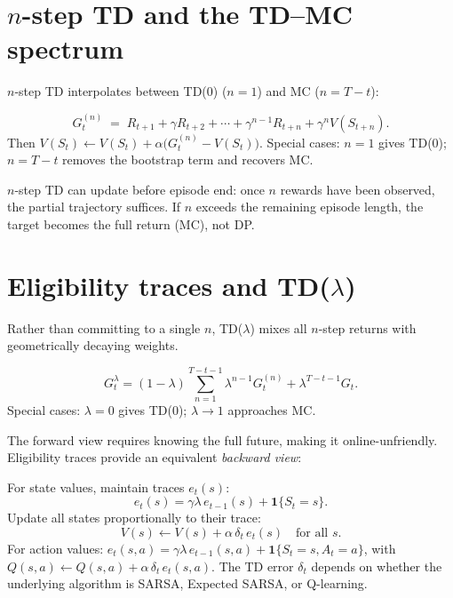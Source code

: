 \documentclass[11pt, oneside]{book}
\begin{document}
\section{$n$-step TD and the TD--MC spectrum}

$n$-step TD interpolates between TD(0) ($n=1$) and MC ($n=T-t$):

\begin{thmbox}[title={$n$-Step Return}]
\[
  G_t^{(n)} \;=\; R_{t+1} + \gamma R_{t+2} + \cdots
    + \gamma^{n-1}R_{t+n} + \gamma^n V(S_{t+n}).
\]
Then $V(S_t) \leftarrow V(S_t) + \alpha\bigl(G_t^{(n)} - V(S_t)\bigr)$.
Special cases: $n=1$ gives TD(0); $n = T-t$ removes the bootstrap term and
recovers MC.
\end{thmbox}

$n$-step TD can update before episode end: once $n$ rewards have been
observed, the partial trajectory suffices.
If $n$ exceeds the remaining episode length, the target becomes the full
return (MC), not DP.

\section{Eligibility traces and TD($\lambda$)}

Rather than committing to a single $n$, TD($\lambda$) mixes all $n$-step
returns with geometrically decaying weights.

\begin{thmbox}[title={$\lambda$-Return (Forward View)}]
\[
  G_t^{\lambda} = (1-\lambda)\sum_{n=1}^{T-t-1}\lambda^{n-1} G_t^{(n)}
    + \lambda^{T-t-1} G_t.
\]
Special cases: $\lambda=0$ gives TD(0); $\lambda \to 1$ approaches MC.
\end{thmbox}

The forward view requires knowing the full future, making it online-unfriendly.
Eligibility traces provide an equivalent \emph{backward view}:

\begin{thmbox}[title={Eligibility Traces (Backward View)}]
For state values, maintain traces $e_t(s)$:
\[
  e_t(s) = \gamma\lambda\,e_{t-1}(s) + \mathbf{1}\{S_t=s\}.
\]
Update all states proportionally to their trace:
\[
  V(s) \leftarrow V(s) + \alpha\,\delta_t\,e_t(s)\quad\text{for all }s.
\]
For action values: $e_t(s,a) = \gamma\lambda\,e_{t-1}(s,a) + \mathbf{1}\{S_t=s,A_t=a\}$,
with $Q(s,a) \leftarrow Q(s,a) + \alpha\,\delta_t\,e_t(s,a)$. The TD error
$\delta_t$ depends on whether the underlying algorithm is SARSA,
Expected SARSA, or Q-learning.
\end{thmbox}
\end{document}
